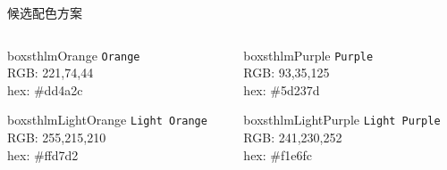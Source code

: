 \documentclass[newPxFont,sthlmFooter]{beamer}
\begin{document}

\begin{frame}[c]{候选配色方案}

\begin{columns}[c]

\begin{column}{0.23\textwidth}
\begin{beamercolorbox}[wd=\linewidth,ht=10ex,dp=3ex]{boxsthlmOrange}
\centering
	\texttt{Orange}\\
	\vspace{1em}
	\tiny{RGB:  221,74,44} \\
	\tiny{hex: \#dd4a2c}
\end{beamercolorbox}

\vspace{3em}

\begin{beamercolorbox}[wd=\linewidth,ht=10ex,dp=3ex]{boxsthlmLightOrange}
\centering
	\texttt{Light Orange}\\
	\vspace{1em}
	\tiny{RGB:  255,215,210} \\
	\tiny{hex: \#ffd7d2}
\end{beamercolorbox}

\end{column}

\begin{column}{0.23\textwidth}
\begin{beamercolorbox}[wd=\linewidth,ht=10ex,dp=3ex]{boxsthlmPurple}
\centering
	\texttt{Purple}\\
	\vspace{1em}
	\tiny{RGB:  93,35,125} \\
	\tiny{hex: \#5d237d}
\end{beamercolorbox}

\vspace{3em}

\begin{beamercolorbox}[wd=\linewidth,ht=10ex,dp=3ex]{boxsthlmLightPurple}
\centering
	\texttt{Light Purple}\\
	\vspace{1em}
	\tiny{RGB:  241,230,252} \\
	\tiny{hex: \#f1e6fc}
\end{beamercolorbox}
\end{column}


\end{columns}
\end{frame}
\end{document}
